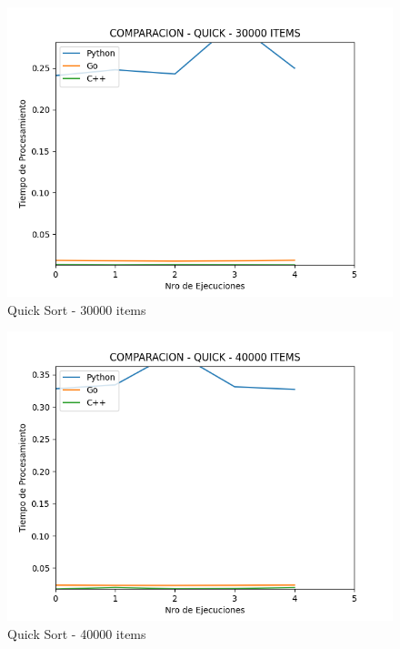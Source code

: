 \documentclass[12pt]{article} %
\begin{document}
    \begin{figure}[H]
    \centering
    \includegraphics[width=\textwidth]{quick_30000}
    \caption{Quick Sort - 30000 items}
    \end{figure}

    \vspace{5mm}
    
    \begin{figure}[H]
    \centering
    \includegraphics[width=\textwidth]{quick_40000}
    \caption{Quick Sort - 40000 items}
    \end{figure}

    \vspace{5mm}
    
\end{document}
